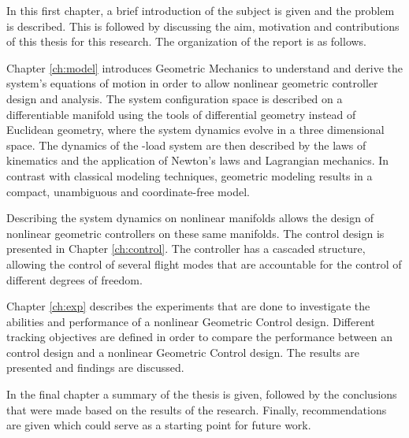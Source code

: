 In this first chapter, a brief introduction of the subject is given and the problem is described. This is followed by discussing the aim, motivation and contributions of this thesis for this research. The organization of the report is as follows.

Chapter \ref{ch:model} introduces Geometric Mechanics to understand and derive the system's equations of motion in order to allow nonlinear geometric controller design and analysis. 
The system configuration space is described on a differentiable manifold using the tools of differential geometry instead of Euclidean geometry, where the system dynamics evolve in a three dimensional space.
The dynamics of the -load system are then described by the laws of kinematics and the application of Newton's laws and Lagrangian mechanics. 
In contrast with classical modeling techniques, geometric modeling results in a compact, unambiguous and coordinate-free model.

Describing the system dynamics on nonlinear manifolds allows the design of nonlinear geometric controllers on these same manifolds. The control design is presented in Chapter \ref{ch:control}. The controller has a cascaded structure, allowing the control of several flight modes that are accountable for the control of different degrees of freedom.

Chapter \ref{ch:exp} describes the experiments that are done to investigate the abilities and performance of a nonlinear Geometric Control design. 
Different tracking objectives are defined in order to compare the performance between an  control design and a nonlinear Geometric Control design. The results are presented and findings are discussed.

In the final chapter a summary of the thesis is given, followed by the conclusions that were made based on the results of the research.
Finally, recommendations are given which could serve as a starting point for future work. 

